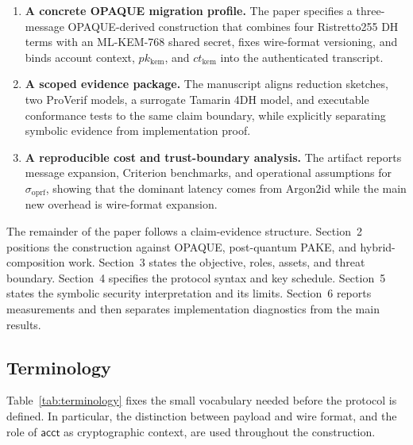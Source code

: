 \documentclass[preprint,12pt]{elsarticle}
\newcommand{\acct}{\mathsf{acct}}
\newcommand{\sigoprf}{\sigma_{\mathrm{oprf}}}
\theoremstyle{remark}
\begin{document}
\begin{enumerate}
  \item \textbf{A concrete OPAQUE migration profile.} The paper specifies a
        three-message OPAQUE-derived construction that combines four
        Ristretto255 DH terms with an ML-KEM-768 shared secret, fixes
        wire-format versioning, and binds account context,
        $pk_{\mathrm{kem}}$, and $ct_{\mathrm{kem}}$ into the
        authenticated transcript.
  \item \textbf{A scoped evidence package.} The manuscript aligns reduction
        sketches, two ProVerif models, a surrogate Tamarin 4DH model, and
        executable conformance tests to the same claim boundary, while
        explicitly separating symbolic evidence from implementation proof.
  \item \textbf{A reproducible cost and trust-boundary analysis.} The artifact
        reports message expansion, Criterion benchmarks, and operational
        assumptions for $\sigoprf$, showing that the dominant latency comes
        from Argon2id while the main new overhead is wire-format expansion.
\end{enumerate}

The remainder of the paper follows a claim-evidence structure.
Section~2 positions the construction against OPAQUE, post-quantum PAKE,
and hybrid-composition work. Section~3 states the objective, roles, assets,
and threat boundary. Section~4 specifies the protocol syntax and key
schedule. Section~5 states the symbolic security interpretation and its
limits. Section~6 reports measurements and then separates implementation
diagnostics from the main results.

\subsection{Terminology}

Table~\ref{tab:terminology} fixes the small vocabulary needed before the
protocol is defined. In particular, the distinction between payload and
wire format, and the role of $\acct$ as cryptographic context, are used
throughout the construction.
\end{document}
